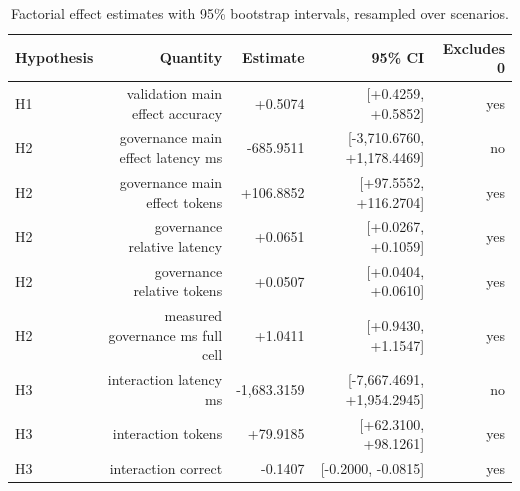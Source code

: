 \begin{table}[htbp]
\centering
\small
\caption{Factorial effect estimates with 95\% bootstrap intervals, resampled over scenarios.}
\label{tab:gmais-5}
\begin{tabular}{lrrrr}
\toprule
Hypothesis & Quantity & Estimate & 95\% CI & Excludes 0 \\
\midrule
H1 & validation main effect accuracy & +0.5074 & [+0.4259, +0.5852] & yes \\
H2 & governance main effect latency ms & -685.9511 & [-3,710.6760, +1,178.4469] & no \\
H2 & governance main effect tokens & +106.8852 & [+97.5552, +116.2704] & yes \\
H2 & governance relative latency & +0.0651 & [+0.0267, +0.1059] & yes \\
H2 & governance relative tokens & +0.0507 & [+0.0404, +0.0610] & yes \\
H2 & measured governance ms full cell & +1.0411 & [+0.9430, +1.1547] & yes \\
H3 & interaction latency ms & -1,683.3159 & [-7,667.4691, +1,954.2945] & no \\
H3 & interaction tokens & +79.9185 & [+62.3100, +98.1261] & yes \\
H3 & interaction correct & -0.1407 & [-0.2000, -0.0815] & yes \\
\bottomrule
\end{tabular}
\end{table}
